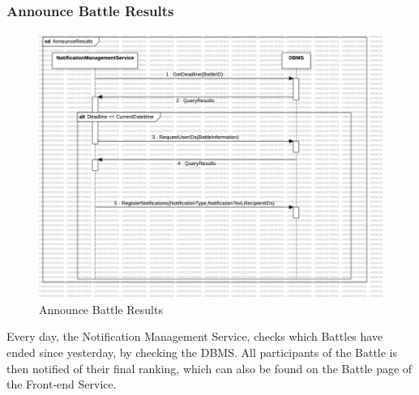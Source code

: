 \subsubsection{Announce Battle Results}
\begin{figure}[H]
    \centering
    \includegraphics[width=\textwidth]{Graphics/Sequence Diagrams/AnnounceResults.png}
    \caption{Announce Battle Results}
    \label{fig:announceresults}
\end{figure}
Every day, the Notification Management Service, checks which Battles have ended since yesterday, by checking the DBMS. All participants of the Battle is then notified of their final ranking, which can also be found on the Battle page of the Front-end Service. 


